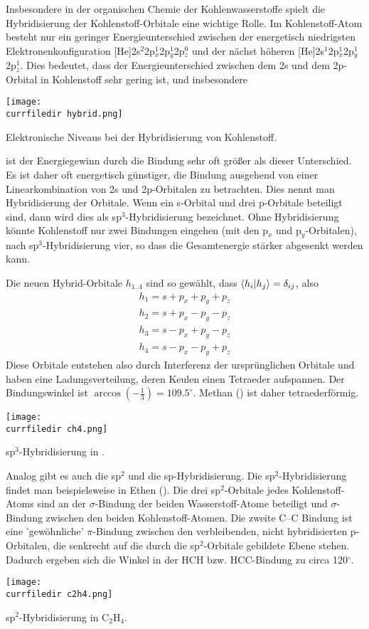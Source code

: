 Insbesondere in der organischen Chemie der Kohlenwasserstoffe spielt die Hybridisierung der Kohlenstoff-Orbitale eine wichtige Rolle. Im Kohlenstoff-Atom besteht nur ein geringer Energieunterschied zwischen der energetisch niedrigsten Elektronenkonfiguration
[He]2s$^2$2p$_x^1$2p$_y^1$2p$_z^0$ und der nächst höheren [He]2s$^1$2p$_x^1$2p$_y^1$2p$_z^1$. Dies bedeutet, dass der Energieunterschied zwischen dem 2s und dem 2p-Orbital in Kohlenstoff sehr gering ist, und insbesondere 
%
\begin{marginfigure}
\texttt{[image: \\currfiledir hybrid.png]}
\caption{Elektronische Niveaus bei der Hybridisierung von Kohlenstoff. }
\end{marginfigure}
%
ist der Energiegewinn durch die Bindung sehr oft größer als dieser Unterschied. Es ist daher oft energetisch günstiger, die Bindung ausgehend von einer Linearkombination von 2s und 2p-Orbitalen zu betrachten. Dies nennt man Hybridisierung der Orbitale. Wenn ein s-Orbital und drei p-Orbitale beteiligt sind, dann wird dies als sp$^3$-Hybridisierung bezeichnet. Ohne Hybridisierung könnte Kohlenstoff nur zwei Bindungen eingehen (mit den p$_x$ und p$_y$-Orbitalen), nach sp$^3$-Hybridisierung vier, so dass die Gesamtenergie stärker abgesenkt werden kann.

Die neuen Hybrid-Orbitale $h_{1 .. 4}$ sind so gewählt, dass $\braket{h_i | h_j} = \delta_{ij}$, also
\begin{eqnarray}
 h_1 = s + p_x + p_y + p_z \\
 h_2 = s + p_x - p_y - p_z \\
 h_3 = s - p_x + p_y - p_z \\
 h_4 = s - p_x - p_y + p_z 
\end{eqnarray}
Diese Orbitale entstehen also durch Interferenz der ursprünglichen Orbitale und haben eine Ladungsverteilung, deren Keulen einen Tetraeder aufspannen. Der Bindungswinkel ist $\arccos (-\frac{1}{3}) = 109.5^\circ$. Methan () ist daher tetraederförmig.
%
\begin{marginfigure}
\texttt{[image: \\currfiledir ch4.png]}
\caption{sp$^3$-Hybridisierung in . }
\end{marginfigure}
%


Analog gibt es auch die sp$^2$ und die sp-Hybridisierung.  Die sp$^2$-Hybridisierung findet man beispielsweise in Ethen (). Die drei  sp$^2$-Orbitale jedes Kohlenstoff-Atoms sind an der $\sigma$-Bindung der beiden Wasserstoff-Atome beteiligt und $\sigma$-Bindung zwischen den beiden Kohlenstoff-Atomen. Die zweite C--C Bindung ist eine 'gewöhnliche' $\pi$-Bindung zwischen den verbleibenden, nicht hybridisierten p-Orbitalen, die senkrecht auf die durch die sp$^2$-Orbitale gebildete Ebene stehen. Dadurch ergeben sich die Winkel in der HCH bzw. HCC-Bindung zu circa 120$^\circ$.
%
\begin{marginfigure}
\texttt{[image: \\currfiledir c2h4.png]}
\caption{sp$^2$-Hybridisierung in C$_2$H$_4$. }
\end{marginfigure}
%

